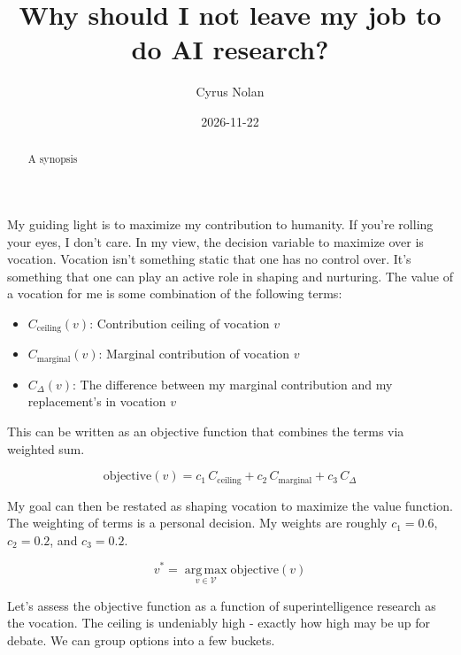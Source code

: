 \documentclass{article}
\title{Why should I not leave my job to do AI research?}
\author{Cyrus Nolan}
\date{2026-11-22}
\begin{document}
\maketitle

\begin{abstract}

A synopsis

\end{abstract}

My guiding light is to maximize my contribution to humanity. If you're rolling your eyes, I don't care. In my view, the decision variable to maximize over is vocation. Vocation isn't something static that one has no control over. It's something that one can play an active role in shaping and nurturing. The value of a vocation for me is some combination of the following terms:

\begin{itemize}
  \item $C_{\mathrm{ceiling}}(v)$: Contribution ceiling of vocation $v$
  \item $C_{\mathrm{marginal}}(v)$: Marginal contribution of vocation $v$
  \item $C_{\Delta}(v)$: The difference between my marginal contribution and my replacement's in vocation $v$
\end{itemize}

This can be written as an objective function that combines the terms via weighted sum.

\[
  \text{objective}(v) = c_1 \, C_{\mathrm{ceiling}} + c_2 \, C_{\mathrm{marginal}} + c_3 \, C_{\Delta}
\]

My goal can then be restated as shaping vocation to maximize the value function. The weighting of terms is a personal decision. My weights are roughly $c_1 = 0.6$, $c_2 = 0.2$, and $c_3 = 0.2$.

\[
  v^* = \operatorname*{arg\,max}_{v \in \mathcal{V}} \text{objective}(v)
\]

Let's assess the objective function as a function of superintelligence research as the vocation. The ceiling is undeniably high - exactly how high may be up for debate. We can group options into a few buckets.
\end{document}
